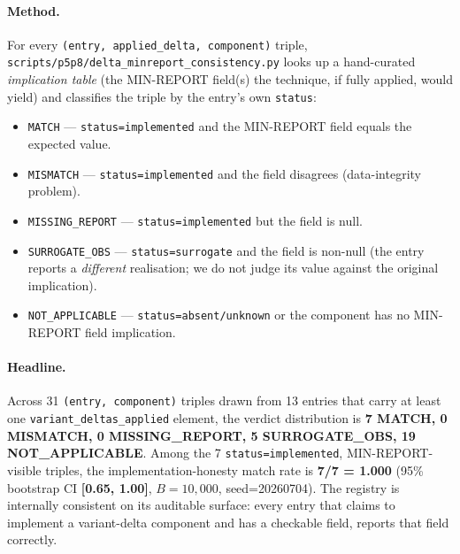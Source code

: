\documentclass{article}
\begin{document}
\paragraph{Method.} For every
\texttt{(entry, applied\_delta, component)} triple,
\texttt{scripts/p5p8/delta\_minreport\_consistency.py} looks up a
hand-curated \emph{implication table} (the MIN-REPORT field(s) the
technique, if fully applied, would yield) and classifies the triple
by the entry's own \texttt{status}:

\begin{itemize}
\item \texttt{MATCH} --- \texttt{status=implemented} and the
MIN-REPORT field equals the expected value.
\item \texttt{MISMATCH} --- \texttt{status=implemented} and the
field disagrees (data-integrity problem).
\item \texttt{MISSING\_REPORT} --- \texttt{status=implemented} but
the field is null.
\item \texttt{SURROGATE\_OBS} --- \texttt{status=surrogate} and the
field is non-null (the entry reports a \emph{different}
realisation; we do not judge its value against the original
implication).
\item \texttt{NOT\_APPLICABLE} --- \texttt{status=absent/unknown} or
the component has no MIN-REPORT field implication.
\end{itemize}

\paragraph{Headline.} Across 31 \texttt{(entry, component)} triples
drawn from 13 entries that carry at least one
\texttt{variant\_deltas\_applied} element, the verdict distribution
is \textbf{7 MATCH, 0 MISMATCH, 0 MISSING\_REPORT, 5
SURROGATE\_OBS, 19 NOT\_APPLICABLE}. Among the 7
\texttt{status=implemented}, MIN-REPORT-visible triples, the
implementation-honesty match rate is \textbf{7/7 = 1.000} (95\%
bootstrap CI \textbf{[0.65, 1.00]}, $B=10{,}000$, seed=20260704).
The registry is internally consistent on its auditable surface:
every entry that claims to implement a variant-delta component and
has a checkable field, reports that field correctly.
\end{document}
